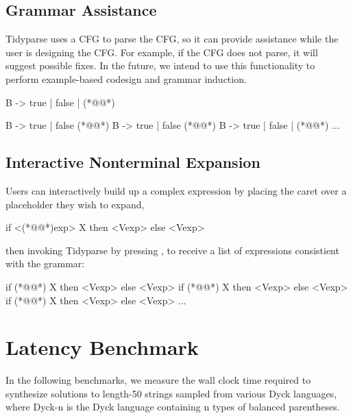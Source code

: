 \documentclass[sigplan,nonacm]{acmart}\settopmatter{printfolios=false,printccs=false,printacmref=false}
\begin{document}
\subsection{Grammar Assistance}

Tidyparse uses a CFG to parse the CFG, so it can provide assistance while the user is designing the CFG. For example, if the CFG does not parse, it will suggest possible fixes. In the future, we intend to use this functionality to perform example-based codesign and grammar induction.

\begin{tidyinput}
B -> true | false | (*@\caret{ }@*)
\end{tidyinput}
\begin{tidyoutput}
B -> true | false (*@\hlred{ }@*)
B -> true | false (*@@*)
B -> true | false | (*@@*)
...
\end{tidyoutput}

\subsection{Interactive Nonterminal Expansion}

Users can interactively build up a complex expression by placing the caret over a placeholder they wish to expand,

\begin{tidyinput}
if <(*@@*)exp> X then <Vexp> else <Vexp>
\end{tidyinput}

\noindent then invoking Tidyparse by pressing \keys{\ctrl + \SPACE}, to receive a list of expressions consistient with the grammar:

\begin{tidyoutput}
if (*@@*) X then <Vexp> else <Vexp>
if (*@@*) X then <Vexp> else <Vexp>
if (*@@*) X then <Vexp> else <Vexp>
...
\end{tidyoutput}

%

\pagebreak
\section{Latency Benchmark}

In the following benchmarks, we measure the wall clock time required to synthesize solutions to length-50 strings sampled from various Dyck languages, where Dyck-n is the Dyck language containing n types of balanced parentheses.
\end{document}

